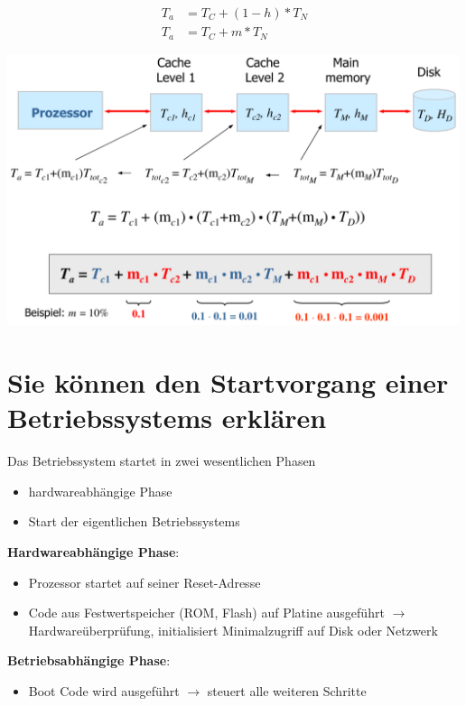 \documentclass{report}
\newenvironment{Figure}
	{\par\medskip\noindent\minipage{\linewidth}}
	{\endminipage\par\medskip}
\theoremstyle{definition}
\theoremstyle{example}
\begin{document}
\begin{equation}
\begin{split}
	T_a &= T_C + (1-h) * T_N\\
	T_a &= T_C + m * T_N
\end{split}
\end{equation}

\begin{Figure}
\centering
\includegraphics[width=500px]{img/BerechnungCacheLevel.png}
	\label{fig:Speicherhierarchie}
\end{Figure}

\section{Sie können den Startvorgang einer Betriebssystems erklären}
Das Betriebssystem startet in zwei wesentlichen Phasen\\
\begin{itemize}
	\item hardwareabhängige Phase
	\item Start der eigentlichen Betriebssystems
\end{itemize}

\textbf{Hardwareabhängige Phase}:\\
\begin{itemize}
	\item Prozessor startet auf seiner Reset-Adresse
	\item Code aus Festwertspeicher (ROM, Flash) auf Platine ausgeführt $\rightarrow$ Hardwareüberprüfung, initialisiert Minimalzugriff auf Disk oder Netzwerk
\end{itemize}

\textbf{Betriebsabhängige Phase}:\\
\begin{itemize}
	\item Boot Code wird ausgeführt $\rightarrow$ steuert alle weiteren Schritte
\end{itemize}
\end{document}
